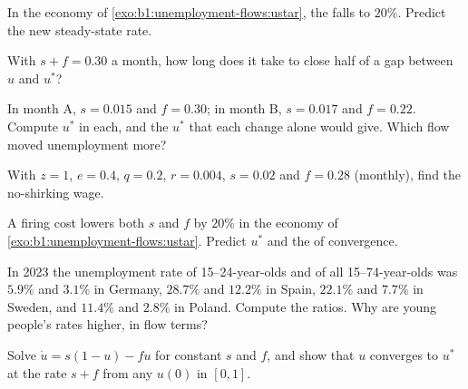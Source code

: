 \begin{exercise}[$\star$]\label{exo:b1:unemployment-flows:predict}
In the economy of \cref{exo:b1:unemployment-flows:ustar}, the 
falls to $20\%$. Predict the new steady-state rate.
\end{exercise}

\begin{exercise}[$\star\star$]\label{exo:b1:unemployment-flows:half}
With $s + f = 0.30$ a month, how long does it take to close half of a gap
between $u$ and $u^*$?
\end{exercise}

\begin{exercise}[$\star\star$]\label{exo:b1:unemployment-flows:which}
In month A, $s = 0.015$ and $f = 0.30$; in month B, $s = 0.017$ and $f = 0.22$. Compute $u^*$ in
each, and the $u^*$ that each change alone would give. Which flow moved
unemployment more?
\end{exercise}

\begin{exercise}[$\star\star$]\label{exo:b1:unemployment-flows:nsw}
With $z = 1$, $e = 0.4$, $q = 0.2$, $r = 0.004$, $s = 0.02$ and $f = 0.28$ (monthly), find the
no-shirking wage.
\end{exercise}

\begin{exercise}[$\star\star$]\label{exo:b1:unemployment-flows:firing}
A firing cost lowers both $s$ and $f$ by $20\%$ in the economy of
\cref{exo:b1:unemployment-flows:ustar}. Predict $u^*$ and the  of
convergence.
\end{exercise}

\begin{exercise}[$\star\star$]\label{exo:b1:unemployment-flows:youth}
In 2023 the unemployment rate of 15--24-year-olds and of all 15--74-year-olds
was $5.9\%$ and $3.1\%$ in Germany, $28.7\%$ and $12.2\%$ in Spain, $22.1\%$ and $7.7\%$
in Sweden, and $11.4\%$ and $2.8\%$ in Poland. %
Compute the ratios. Why are young people's rates higher, in flow terms?
\end{exercise}

\begin{exercise}[$\star\star\star$]\label{exo:b1:unemployment-flows:solve}
Solve $\dot u = s(1 - u) - fu$ for constant $s$ and $f$, and show that $u$ converges to $u^*$
at the rate $s + f$ from any $u(0)$ in $[0, 1]$.
\end{exercise}

